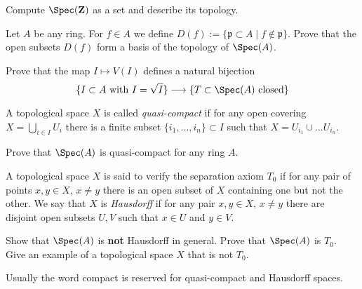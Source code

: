 \begin{exercise}
\label{exercise-spec-Z}
Compute $\Spec(\mathbf{Z})$ as a set and describe its topology.
\end{exercise}

\begin{exercise}
\label{exercise-basis-opens-standard}
Let $A$ be any ring. For $f\in A$ we define
$D(f):= \{\mathfrak p \subset A \mid f \not \in \mathfrak p\}$.
Prove that the open subsets $D(f)$ form a basis of the topology of
$\Spec(A)$.
\end{exercise}

\begin{exercise}
\label{exercise-radical-ideals-closed}
Prove that the map $I\mapsto V(I)$
defines a natural bijection
$$
\{I\subset A\text{ with }I = \sqrt{I}\}
\longrightarrow
\{T\subset \Spec(A)\text{ closed}\}
$$
\end{exercise}

\begin{definition}
\label{definition-quasi-compact}
A topological space $X$ is called {\it quasi-compact}
if for any open covering $X = \bigcup_{i\in I} U_i$ there is a finite
subset $\{i_1, \ldots, i_n\}\subset I$ such that $X = U_{i_1}\cup\ldots
U_{i_n}$.
\end{definition}

\begin{exercise}
\label{exercise-spec-quasi-compact}
Prove that $\Spec(A)$ is quasi-compact for any ring $A$.
\end{exercise}

\begin{definition}
\label{definition-Hausdorff}
A topological space $X$ is said to verify the separation axiom $T_0$
if for any pair of points $x, y\in X$, $x\not = y$ there is an open
subset of $X$ containing one but not the other.
We say that $X$ is {\it Hausdorff} if for any pair $x, y\in X$, $x\not = y$
there are disjoint open subsets $U, V$ such that $x\in U$
and $y\in V$.
\end{definition}

\begin{exercise}
\label{exercise-not-hausdorff}
Show that $\Spec(A)$ is {\bf not} Hausdorff in general.
Prove that $\Spec(A)$ is $T_0$. Give an example of a topological
space $X$ that is not $T_0$.
\end{exercise}

\begin{remark}
\label{remark-not-hausdorff}
Usually the word compact is reserved for quasi-compact and
Hausdorff spaces.
\end{remark}

